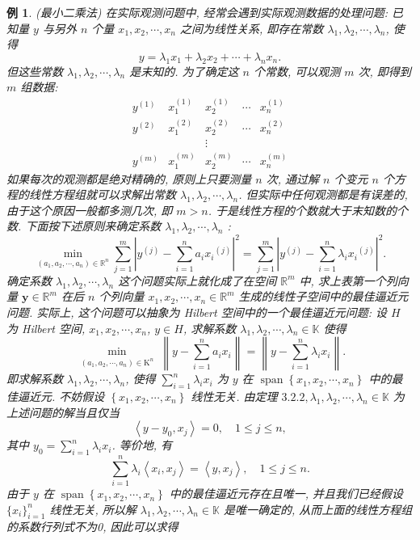 \documentclass[openany]{ctexbook}
\theoremstyle{kaiti}
\theoremstyle{normal}
\newtheorem{example}{例}[section]
\begin{document}
\begin{example}
(最小二乘法) 在实际观测问题中, 经常会遇到实际观测数据的处理问题: 已知量 $y$ 与另外 $n$ 个量 $x_1, x_2, \cdots, x_n$ 之间为线性关系, 即存在常数 $\lambda_1, \lambda_2, \cdots, \lambda_n$, 使得
$$
y=\lambda_1 x_1+\lambda_2 x_2+\cdots+\lambda_n x_n.
$$
但这些常数 $\lambda_1, \lambda_2, \cdots, \lambda_n$ 是末知的. 为了确定这 $n$ 个常数, 可以观测 $m$ 次, 即得到 $m$ 组数据:
$$
\begin{array}{ccccc}
y^{(1)} & x_1^{(1)} & x_2^{(1)} & \cdots & x_n^{(1)} \\
y^{(2)} & x_1^{(2)} & x_2^{(2)} & \cdots & x_n^{(2)} \\
& & \vdots & & \\
y^{(m)} & x_1^{(m)} & x_2^{(m)} & \cdots & x_n^{(m)}
\end{array}
$$
如果每次的观测都是绝对精确的, 原则上只要测量 $n$ 次, 通过解 $n$ 个变元 $n$ 个方程的线性方程组就可以求解出常数 $\lambda_1, \lambda_2, \cdots, \lambda_n$. 但实际中任何观测都是有误差的, 由于这个原因一般都多测几次, 即 $m>n$. 于是线性方程的个数就大于末知数的个数. 下面按下述原则来确定系数 $\lambda_1, \lambda_2, \cdots, \lambda_n$ :
$$
\min _{\left(a_1, a_2, \cdots, a_n\right) \in \mathbb{R}^n} \sum_{j=1}^m\left|y^{(j)}-\sum_{i=1}^n a_{i} x_{i}{ }^{(j)}\right|^2=\sum_{j=1}^m\left|y^{(j)}-\sum_{i=1}^n \lambda_{i} x_{i}{ }^{(j)}\right|^2.
$$
确定系数 $\lambda_1, \lambda_2, \cdots, \lambda_n$ 这个问题实际上就化成了在空间 $\mathbb{R}^m$ 中, 求上表第一个列向量 $\boldsymbol{y} \in \mathbb{R}^m$ 在后 $n$ 个列向量 $x_1, x_2, \cdots, x_n \in \mathbb{R}^m$ 生成的线性子空间中的最佳逼近元问题. 实际上, 这个问题可以抽象为 Hilbert 空间中的一个最佳逼近元问题: 设 $H$ 为 Hilbert 空间, $x_1, x_2, \cdots, x_n$, $y \in H$, 求解系数 $\lambda_1, \lambda_2, \cdots, \lambda_n \in \mathbb{K}$ 使得
$$
\min _{\substack{\left(a_1, a_2, \cdots, a_n\right) \in \mathrm{K}^n}}\left\|y-\sum_{i=1}^n a_{i} x_{i}\right\|=\left\|y-\sum_{i=1}^n \lambda_{i} x_{i}\right\|.
$$
即求解系数 $\lambda_1, \lambda_2, \cdots, \lambda_n$, 使得 $\sum_{i=1}^n \lambda_{i} x_{i}$ 为 $y$ 在 $\operatorname{span}\left\{x_1, x_2, \cdots, x_n\right\}$ 中的最佳逼近元. 不妨假设 $\left\{x_1, x_2, \cdots, x_n\right\}$ 线性无关. 由定理 $3.2.2, \lambda_1, \lambda_2, \cdots, \lambda_n \in \mathbb{K}$ 为上述问题的解当且仅当
$$
\left\langle y-y_0, x_{j}\right\rangle=0, \quad 1 \leqslant j \leqslant n,
$$
其中 $y_0=\sum_{i=1}^n \lambda_{i} x_{i}$. 等价地, 有
$$
\sum_{i=1}^n \lambda_{i}\left\langle x_{i}, x_{j}\right\rangle=\left\langle y, x_{j}\right\rangle, \quad 1 \leqslant j \leqslant n.
$$
由于 $y$ 在 $\operatorname{span}\left\{x_1, x_2, \cdots, x_n\right\}$ 中的最佳逼近元存在且唯一, 并且我们已经假设 $\{x_i\}_{i=1}^n$ 线性无关, 所以解 $\lambda_1, \lambda_2, \cdots, \lambda_n \in \mathbb{K}$ 是唯一确定的, 从而上面的线性方程组的系数行列式不为0, 因此可以求得

\end{example}
\end{document}
